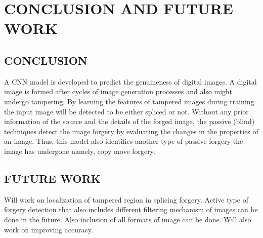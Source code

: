 
\chapter{CONCLUSION AND FUTURE WORK} %
\newline
\section{CONCLUSION}
A CNN model is developed to predict the genuineness of digital images. A digital image is formed after cycles of image generation processes and also might undergo tampering. By learning the features of tampered images during training the input image will be detected to be either spliced or not. Without any prior information of the source and the details of the forged image, the passive (blind) techniques detect the image forgery by evaluating the changes in the properties of an image. Thus, this model also identifies another type of passive forgery the image has undergone namely, copy move forgery.


\section{FUTURE WORK}
Will work on localization of tampered region in splicing forgery. Active type of forgery detection that also includes different filtering mechanism of images can be done in the future. Also inclusion of all formats of image can be done. Will also work on improving accuracy.

